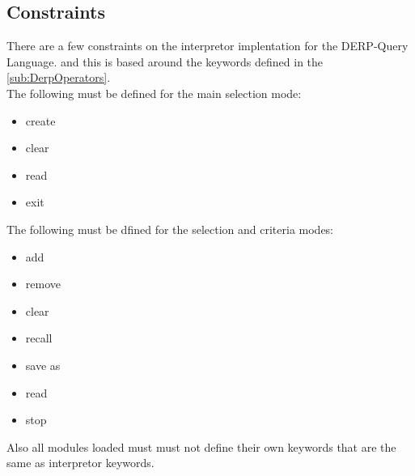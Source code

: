 \subsection{Constraints}
There are a few constraints on the interpretor implentation for the DERP-Query Language. and this is based around the keywords  defined in the \autoref{sub:DerpOperators}. 
\\The following must be defined for the main selection mode:

\begin{itemize}
    \item create 
    \item clear
    \item read
    \item exit 
\end{itemize}

\noindent The following must be dfined for the selection and criteria modes:

\begin{itemize}
    \item add
    \item remove
    \item clear
    \item recall
    \item save as
    \item read
    \item stop
\end{itemize}

\noindent Also all modules loaded must must not define their own keywords that are the same as interpretor keywords.
